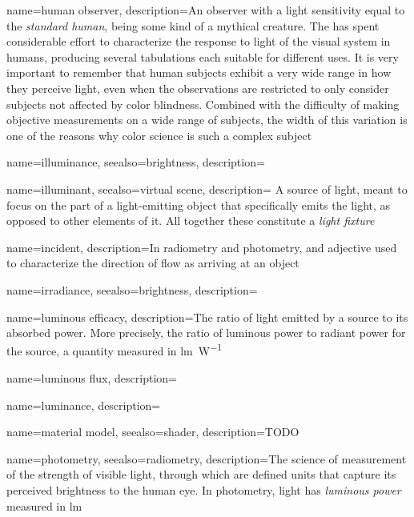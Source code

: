 {    
	name={human observer},
	description={An observer with a light sensitivity equal to the \textsl{standard human},
		being some kind of a mythical creature.
		The  has spent considerable effort to characterize the response to light 
		of the visual system in humans, producing several tabulations each suitable for
		different uses. 
		It is very important to remember that human subjects exhibit a very wide range 
		in how they perceive light, even when the observations are restricted to only 
		consider subjects not affected by color blindness.
		Combined with the difficulty of making objective measurements on a wide range 
		of subjects, the width of this variation is one of the reasons why color science is
		such a complex subject}
}

{
	name=illuminance,
	seealso={brightness},
	description=\nopostdesc
}

{
	name=illuminant,
	seealso={virtual scene},
	description={
		A source of light, meant to focus on the part of a light-emitting object that
	    specifically emits the light, as opposed to other elements of it. All together
        these constitute a \textsl{light fixture}}
}

{
	name={incident},
	description={In radiometry and photometry, and adjective used to characterize the direction of
		flow as arriving at an object}
}

{
	name=irradiance,
	seealso={brightness},
	description=\nopostdesc
}

{
	name={luminous efficacy},
	description={The ratio of light emitted by a source to its absorbed power.
		More precisely, the ratio of luminous power to radiant power for the source,
		a quantity measured in \unit{\lumen\per\watt}}
}

{
	name={luminous flux},
	description=\nopostdesc
}

{
	name={luminance},
	description=\nopostdesc
}

{
	name={material model},
	seealso={shader},
	description={TODO}
}

{
	name={photometry},
	seealso={radiometry},
	description={The science of measurement of the strength of visible light, 
		through which are defined units that capture its perceived brightness 
		to the human eye. In photometry, light has \textsl{luminous power} 
		measured in \unit{\lumen}}
}


